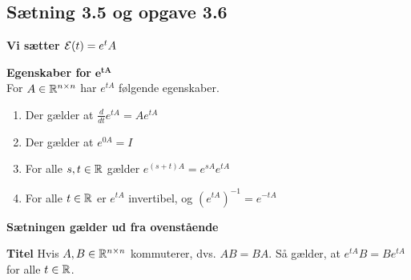 \subsection{Sætning 3.5 og opgave 3.6}
\textbf{Vi sætter $\mathcal{E}(t) = e^tA$}
\begin{thmx} \textbf{Egenskaber for} $\bm{e^{tA}}$\\
For $A\in\mathbb{R}^{n\times n}$ har $e^{tA}$ følgende egenskaber. 
    \begin{enumerate}
        \item Der gælder at $\frac{d}{dt}e^{tA} = Ae^{tA}$
        \item Der gælder at $e^{0A} = I$
        \item For alle $s,t\in \mathbb{R}$ gælder $e^{(s+t)A} = e^{sA} e^{tA}$
        \item For alle $t\in\mathbb{R}$ er $e^{tA}$ invertibel, og $(e^{tA})^{-1} = e^{-tA}$
    \end{enumerate}
\end{thmx}
\textbf{Sætningen gælder ud fra ovenstående}

\begin{kor}\textbf{Titel}\label{AB_kommuterer_kor}
\newline
    Hvis $A, B \in \mathbb{R}^{n\times n}$ kommuterer, dvs. $AB=BA$. Så gælder, at $e^{tA}B=Be^{tA}$ for alle $t \in \mathbb{R}$.
\end{kor}

